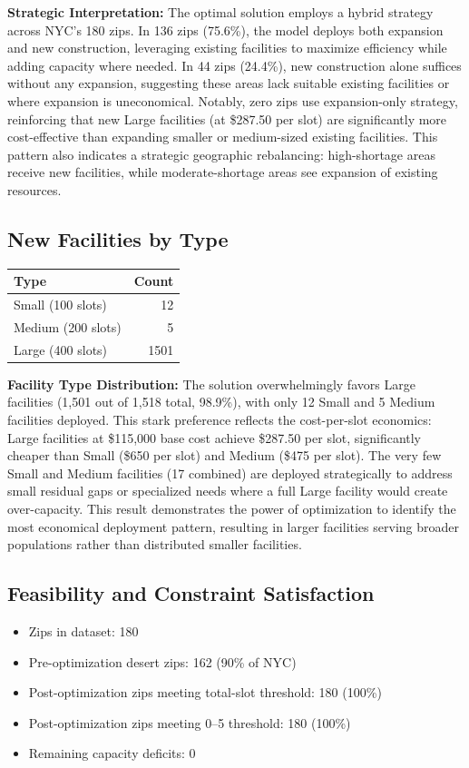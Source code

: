 \documentclass[12pt]{article}
\begin{document}
\noindent\textbf{Strategic Interpretation:} The optimal solution employs a hybrid strategy across NYC's 180 zips. In 136 zips (75.6\%), the model deploys both expansion and new construction, leveraging existing facilities to maximize efficiency while adding capacity where needed. In 44 zips (24.4\%), new construction alone suffices without any expansion, suggesting these areas lack suitable existing facilities or where expansion is uneconomical. Notably, zero zips use expansion-only strategy, reinforcing that new Large facilities (at \$287.50 per slot) are significantly more cost-effective than expanding smaller or medium-sized existing facilities. This pattern also indicates a strategic geographic rebalancing: high-shortage areas receive new facilities, while moderate-shortage areas see expansion of existing resources.

\subsection{New Facilities by Type}
\begin{table}[h]
\centering
\begin{tabular}{@{}lr@{}}
\toprule
Type & Count \\
\midrule
Small (100 slots) & 12 \\
Medium (200 slots) & 5 \\
Large (400 slots) & 1501 \\
\bottomrule
\end{tabular}
\end{table}

\noindent\textbf{Facility Type Distribution:} The solution overwhelmingly favors Large facilities (1,501 out of 1,518 total, 98.9\%), with only 12 Small and 5 Medium facilities deployed. This stark preference reflects the cost-per-slot economics: Large facilities at \$115,000 base cost achieve \$287.50 per slot, significantly cheaper than Small (\$650 per slot) and Medium (\$475 per slot). The very few Small and Medium facilities (17 combined) are deployed strategically to address small residual gaps or specialized needs where a full Large facility would create over-capacity. This result demonstrates the power of optimization to identify the most economical deployment pattern, resulting in larger facilities serving broader populations rather than distributed smaller facilities.

\subsection{Feasibility and Constraint Satisfaction}
\begin{itemize}
    \item Zips in dataset: 180
    \item Pre-optimization desert zips: 162 (90\% of NYC)
    \item Post-optimization zips meeting total-slot threshold: 180 (100\%)
    \item Post-optimization zips meeting 0--5 threshold: 180 (100\%)
    \item Remaining capacity deficits: 0
\end{itemize}
\end{document}
